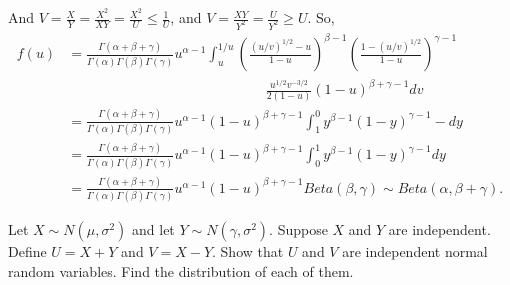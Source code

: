 \documentclass[14pt]{elegantbook}
\begin{document}
\begin{solution}
\begin{enumerate}[(a)]
            And $V=\frac{X}{Y}=\frac{X^2}{XY}=\frac{X^2}{U}\leq\frac{1}{U}$, and $V=\frac{XY}{Y^2}=\frac{U}{Y^2}\geq U$. So, 
            \begin{align*}
                f(u)&=\frac{\Gamma(\alpha+\beta+\gamma)}{\Gamma(\alpha)\Gamma(\beta)\Gamma(\gamma)}u^{\alpha-1}\int_u^{1/u}\left(\frac{(u/v)^{1/2}-u}{1-u}\right)^{\beta-1}\left(\frac{1-(u/v)^{1/2}}{1-u}\right)^{\gamma-1}\\
                &\hspace{170pt}\frac{u^{1/2}v^{-3/2}}{2(1-u)}(1-u)^{\beta+\gamma-1}dv\\
                &=\frac{\Gamma(\alpha+\beta+\gamma)}{\Gamma(\alpha)\Gamma(\beta)\Gamma(\gamma)}u^{\alpha-1}(1-u)^{\beta+\gamma-1}\int_1^{0}y^{\beta-1}\left(1-y\right)^{\gamma-1}-dy\\
                &=\frac{\Gamma(\alpha+\beta+\gamma)}{\Gamma(\alpha)\Gamma(\beta)\Gamma(\gamma)}u^{\alpha-1}(1-u)^{\beta+\gamma-1}\int_0^{1}y^{\beta-1}\left(1-y\right)^{\gamma-1}dy\\
                &=\frac{\Gamma(\alpha+\beta+\gamma)}{\Gamma(\alpha)\Gamma(\beta)\Gamma(\gamma)}u^{\alpha-1}(1-u)^{\beta+\gamma-1} Beta(\beta, \gamma)\sim Beta(\alpha, \beta+\gamma). 
            \end{align*}
        \end{enumerate}
    \end{solution}

    \setcounter{exer}{26}
    \begin{exercise}
        Let $X \sim N(\mu, \sigma^2)$ and let $Y \sim N(\gamma, \sigma^2)$. Suppose $X$ and $Y$ are independent. Define $U = X +Y$ and $V = X- Y$. Show that $U$ and $V$ are independent normal random variables. Find the distribution of each of them. 
    \end{exercise}
\end{document}
